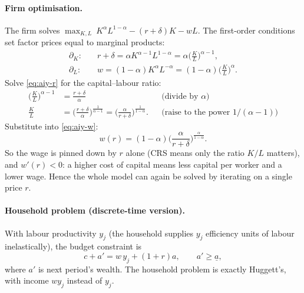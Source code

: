 \paragraph{Firm optimisation.} The firm solves $\max_{K,L}\ K^\alpha L^{1-\alpha}-(r+\delta)K-wL$. The first-order conditions set factor prices equal to marginal products:
\begin{align}
  \partial_K:\quad & r+\delta=\alpha K^{\alpha-1}L^{1-\alpha}=\alpha\Big(\frac{K}{L}\Big)^{\alpha-1},\label{eq:aiy-r}\\
  \partial_L:\quad & w=(1-\alpha)K^{\alpha}L^{-\alpha}=(1-\alpha)\Big(\frac{K}{L}\Big)^{\alpha}.\label{eq:aiy-w}
\end{align}
Solve \eqref{eq:aiy-r} for the capital--labour ratio:
\begin{align*}
  \Big(\frac{K}{L}\Big)^{\alpha-1}&=\frac{r+\delta}{\alpha}
  &&\text{(divide by }\alpha\text{)}\\
  \frac{K}{L}&=\Big(\frac{r+\delta}{\alpha}\Big)^{\frac{1}{\alpha-1}}=\Big(\frac{\alpha}{r+\delta}\Big)^{\frac{1}{1-\alpha}}.
  &&\text{(raise to the power }1/(\alpha-1)\text{)}
\end{align*}
Substitute into \eqref{eq:aiy-w}:
\begin{equation}\label{eq:aiy-wr}
  w(r)=(1-\alpha)\Big(\frac{\alpha}{r+\delta}\Big)^{\frac{\alpha}{1-\alpha}}.
\end{equation}
So the wage is pinned down by $r$ alone (CRS means only the ratio $K/L$ matters), and $w'(r)<0$: a higher cost of capital means less capital per worker and a lower wage. Hence the whole model can again be solved by iterating on a single price $r$.

\paragraph{Household problem (discrete-time version).} With labour productivity $y_j$ (the household supplies $y_j$ efficiency units of labour inelastically), the budget constraint is
\begin{equation*}
  c+a'=w\,y_j+(1+r)a,\qquad a'\ge\underline a,
\end{equation*}
where $a'$ is next period's wealth. The household problem is exactly Huggett's, with income $w y_j$ instead of $y_j$.

